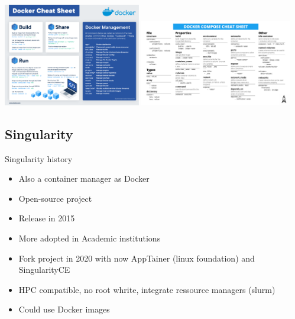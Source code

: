 \begin{frame}
\includegraphics[width=0.45\textwidth]{images/docker-cheat-sheet.pdf}
\includegraphics[width=0.5\textwidth]{images/docker-compose-cheat-sheet.pdf}
\end{frame}

\subsection{Singularity}
\begin{frame}[<+->]{Singularity history}
\begin{itemize}
\item Also a container manager as Docker
\item Open-source project
\item Release in 2015
\item More adopted in Academic institutions
\item Fork project in 2020 with now AppTainer (linux foundation) and SingularityCE
\item HPC compatible, no root whrite, integrate ressource managers (slurm)
\item Could use Docker images
\end{itemize}
\end{frame}

